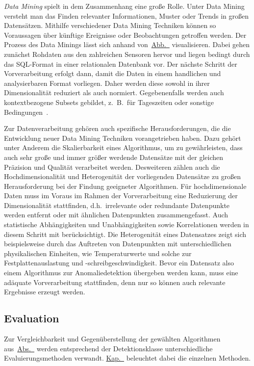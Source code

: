 \textit{Data Mining} spielt in dem Zusammenhang eine große Rolle. Unter Data Mining versteht man das Finden relevanter Informationen,
Muster oder Trends in großen Datensätzen. Mithilfe verschiedener Data Mining Techniken können so Voraussagen über künftige Ereignisse oder
Beobachtungen getroffen werden. Der Prozess des Data Minings lässt sich anhand von~\hyperref[fig:data_mining]{Abb.~}
visualisieren. Dabei gehen zunächst Rohdaten aus den zahlreichen Sensoren hervor und liegen bedingt durch das SQL-Format in einer
relationalen Datenbank vor. Der nächste Schritt der Vorverarbeitung erfolgt dann, damit die Daten in einem handlichen und analysierbaren
Format vorliegen. Daher werden diese sowohl in ihrer Dimensionalität reduziert als auch normiert. Gegebenenfalls werden auch
kontextbezogene Subsets gebildet, z.~B.~für Tageszeiten oder sonstige Bedingungen~\Cite[Kap.~1]{Tan2014}.

Zur Datenverarbeitung gehören auch spezifische Herausforderungen, die die Entwicklung neuer Data Mining Techniken vorangetrieben haben.
Dazu gehört unter Anderem die Skalierbarkeit eines Algorithmus, um zu gewährleisten, dass auch sehr große und immer größer werdende
Datensätze mit der gleichen Präzision und Qualität verarbeitet werden. Desweiteren zählen auch die Hochdimensionalität und Heterogenität
der vorliegenden Datensätze zu großen Herausforderung bei der Findung geeigneter Algorithmen. Für hochdimensionale Daten muss im Voraus
im Rahmen der Vorverarbeitung eine Reduzierung der Dimensionalität stattfinden, d.h.~irrelevante oder redundante Datenpunkte werden
entfernt oder mit ähnlichen Datenpunkten zusammengefasst. Auch statistische Abhängigkeiten und Unabhängigkeiten sowie Korrelationen
werden in diesem Schritt mit berücksichtigt. Die Heterogenität eines Datensatzes zeigt sich beispielsweise durch das Auftreten von
Datenpunkten mit unterschiedlichen physikalischen Einheiten, wie Temperaturwerte und solche zur Festplattenauslastung und
-schreibgeschwindigkeit. Bevor ein Datensatz also einem Algorithmus zur Anomaliedetektion übergeben werden kann, muss eine adäquate
Vorverarbeitung stattfinden, denn nur so können auch relevante Ergebnisse erzeugt werden.


\newpage
\subsection{Evaluation}\label{subsec:evaluation}
Zur Vergleichbarkeit und Gegenüberstellung der gewählten Algorithmen aus~\hyperref[sec:algorithmen]{Abs.~} werden
entsprechend der Detektionsklasse unterschiedliche Evaluierungsmethoden verwandt.
\hyperref[ch:anomaliedetektion_test]{Kap.~} beleuchtet dabei die einzelnen Methoden.

